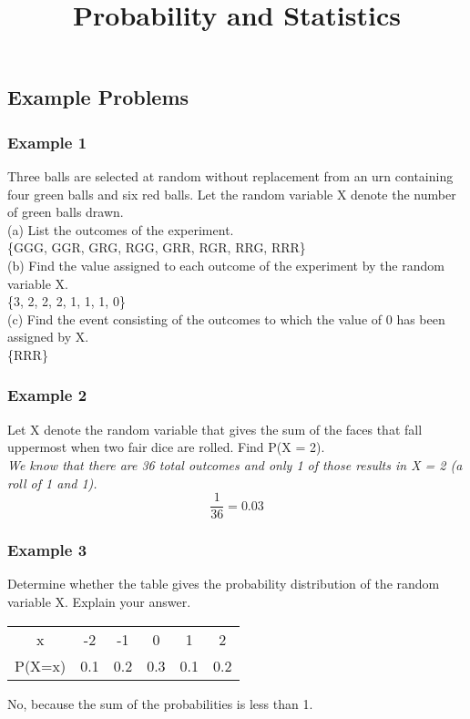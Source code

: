 \documentclass[]{article}
\title{\vspace{-5ex}Probability and Statistics \vspace{-5ex}}
\author{}
\date{}
\begin{document}
	\maketitle{}
	
	\subsection*{Example Problems}
	\subsubsection*{Example 1}
	Three balls are selected at random without replacement from an urn containing four green balls and six red balls. Let the random variable X denote the number of green balls drawn. \\
	(a) List the outcomes of the experiment. \\
	\indent \{GGG, GGR, GRG, RGG, GRR, RGR, RRG, RRR\} \\
	(b) Find the value assigned to each outcome of the experiment by the random variable X. \\
	\indent \{3, 2, 2, 2, 1, 1, 1, 0\} \\
	(c) Find the event consisting of the outcomes to which the value of 0 has been assigned by X. \\
	\indent \{RRR\}
	
	\subsubsection*{Example 2}
	Let X denote the random variable that gives the sum of the faces that fall uppermost when two fair dice are rolled. Find P(X = 2). \\
	\emph{We know that there are 36 total outcomes and only 1 of those results in X = 2 (a roll of 1 and 1).}
	\begin{equation*}
		\frac{1}{36} = 0.03
	\end{equation*}

	\subsubsection*{Example 3}
	Determine whether the table gives the probability distribution of the random variable X. Explain your answer.
	\begin{center}
		\begin{tabular}{ |c|c|c|c|c|c| }
			\hline
				x & -2 & -1 & 0 & 1 & 2 \\
				P(X=x) & 0.1 & 0.2 & 0.3 & 0.1 & 0.2 \\
			\hline
		\end{tabular}
	\end{center}
	No, because the sum of the probabilities is less than 1.
	
\end{document}
